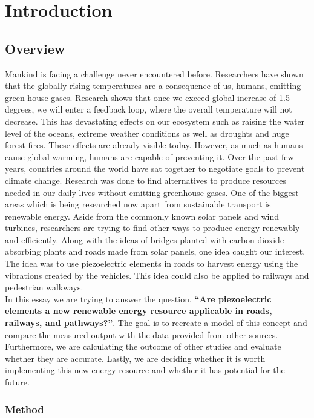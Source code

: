 \chapter{Introduction}

\section{Overview}

Mankind is facing a challenge never encountered before. Researchers have shown that the globally rising temperatures are a consequence of us, humans, emitting green-house gases. Research shows that once we exceed global increase of 1.5 degrees, we will enter a feedback loop, where the overall temperature will not decrease. This has devastating effects on our ecosystem such as raising the water level of the oceans, extreme weather conditions as well as droughts and huge forest fires. These effects are already visible today. However, as much as humans cause global warming, humans are capable of preventing it. Over the past few years, countries around the world have sat together to negotiate goals to prevent climate change. Research was done to find alternatives to produce resources needed in our daily lives without emitting greenhouse gases. One of the biggest areas which is being researched now apart from sustainable transport is renewable energy. Aside from the commonly known solar panels and wind turbines, researchers are trying to find other ways to produce energy renewably and efficiently. Along with the ideas of bridges planted with carbon dioxide absorbing plants and roads made from solar panels, one idea caught our interest. The idea was to use piezoelectric elements in roads to harvest energy using the vibrations created by the vehicles. This idea could also be applied to railways and pedestrian walkways.\cite{Mumcu2021} \\
In this essay we are trying to answer the question, \textbf{“Are piezoelectric elements a new renewable energy resource applicable in roads, railways, and pathways?”}. The goal is to recreate a model of this concept and compare the measured output with the data provided from other sources. Furthermore, we are calculating the outcome of other studies and evaluate whether they are accurate. Lastly, we are deciding whether it is worth implementing this new energy resource and whether it has potential for the future. 

\subsection{Method}

